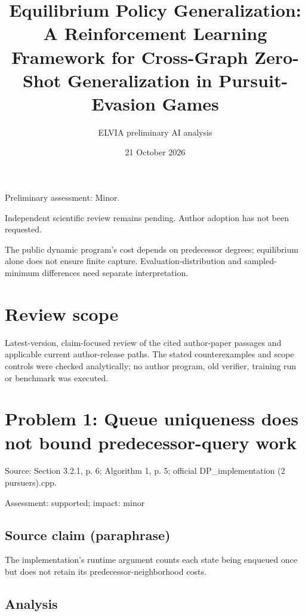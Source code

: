 \documentclass[11pt]{article}
\begin{document}
\title{Equilibrium Policy Generalization: A Reinforcement Learning Framework for Cross-Graph Zero-Shot Generalization in Pursuit-Evasion Games}

\author{ELVIA preliminary AI analysis}\date{21 October 2026}\maketitle

Preliminary assessment: Minor.\par

Independent scientific review remains pending. Author adoption has not been requested.

The public dynamic program’s cost depends on predecessor degrees; equilibrium alone does not ensure finite capture. Evaluation-distribution and sampled-minimum differences need separate interpretation.

\section*{Review scope}

Latest-version, claim-focused review of the cited author-paper passages and applicable current author-release paths. The stated counterexamples and scope controls were checked analytically; no author program, old verifier, training run or benchmark was executed.

\section*{Problem 1: Queue uniqueness does not bound predecessor-query work}

Source: Section 3.2.1, p. 6; Algorithm 1, p. 5; official DP\_implementation (2 pursuers).cpp.

Assessment: supported; impact: minor

\subsection*{Source claim (paraphrase)}

The implementation’s runtime argument counts each state being enqueued once but does not retain its predecessor-neighborhood costs.

\subsection*{Analysis}
\end{document}
